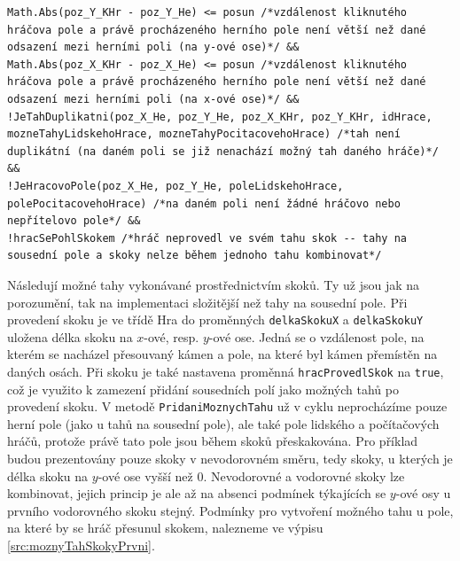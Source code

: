 \begin{lstlisting}[label=src:moznyTahSousedniPole,caption={Podmínky pro vytvoření možného tahu - sousední pole}]
Math.Abs(poz_Y_KHr - poz_Y_He) <= posun /*vzdálenost kliknutého hráčova pole a právě procházeného herního pole není větší než dané odsazení mezi herními poli (na y-ové ose)*/ &&
Math.Abs(poz_X_KHr - poz_X_He) <= posun /*vzdálenost kliknutého hráčova pole a právě procházeného herního pole není větší než dané odsazení mezi herními poli (na x-ové ose)*/ &&
!JeTahDuplikatni(poz_X_He, poz_Y_He, poz_X_KHr, poz_Y_KHr, idHrace, mozneTahyLidskehoHrace, mozneTahyPocitacovehoHrace) /*tah není duplikátní (na daném poli se již nenachází možný tah daného hráče)*/ &&
!JeHracovoPole(poz_X_He, poz_Y_He, poleLidskehoHrace, polePocitacovehoHrace) /*na daném poli není žádné hráčovo nebo nepřítelovo pole*/ &&
!hracSePohlSkokem /*hráč neprovedl ve svém tahu skok -- tahy na sousední pole a skoky nelze během jednoho tahu kombinovat*/
\end{lstlisting}

Následují možné tahy vykonávané prostřednictvím skoků. Ty už jsou jak na porozumění, tak na implementaci složitější než tahy na sousední pole. Při provedení skoku je ve třídě Hra do proměnných \lstinline$delkaSkokuX$ a \lstinline$delkaSkokuY$ uložena délka skoku na $x$-ové, resp. $y$-ové ose. Jedná se o vzdálenost pole, na kterém se nacházel přesouvaný kámen a pole, na které byl kámen přemístěn na daných osách. Při skoku je také nastavena proměnná \lstinline$hracProvedlSkok$ na \lstinline$true$, což je využito k zamezení přidání sousedních polí jako možných tahů po provedení skoku. V metodě \lstinline$PridaniMoznychTahu$ už v cyklu neprocházíme pouze herní pole (jako u tahů na sousední pole), ale také pole lidského a počítačových hráčů, protože právě tato pole jsou během skoků přeskakována. Pro příklad budou prezentovány pouze skoky v nevodorovném směru, tedy skoky, u kterých je délka skoku na $y$-ové ose vyšší než 0. Nevodorovné a vodorovné skoky lze kombinovat, jejich princip je ale až na absenci podmínek týkajících se $y$-ové osy u prvního vodorovného skoku stejný. Podmínky pro vytvoření možného tahu u pole, na které by se hráč přesunul skokem, nalezneme ve výpisu \ref{src:moznyTahSkokyPrvni}.

